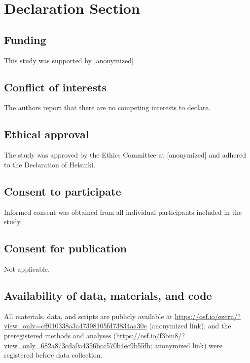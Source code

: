 \documentclass[
  man,
  floatsintext,
  longtable,
  nolmodern,
  notxfonts,
  notimes,
  mask,
  colorlinks=true,linkcolor=blue,citecolor=blue,urlcolor=blue]{apa7}
\begin{document}
\section{Declaration Section}\label{declaration-section}

\subsection{Funding}\label{funding}

This study was supported by {[}anonymized{]}

\subsection{Conflict of interests}\label{conflict-of-interests}

The authors report that there are no competing interests to declare.

\subsection{Ethical approval}\label{ethical-approval}

The study was approved by the Ethics Committee at {[}anonymized{]} and
adhered to the Declaration of Helsinki.

\subsection{Consent to participate}\label{consent-to-participate}

Informed consent was obtained from all individual participants included
in the study.

\subsection{Consent for publication}\label{consent-for-publication}

Not applicable.

\subsection{Availability of data, materials, and
code}\label{availability-of-data-materials-and-code}

All materials, data, and scripts are publicly available at
\url{https://osf.io/ezcrn/?view_only=cff010338a3a47398105fd73834aa30e}
(anonymized link), and the preregistered methods and analyses
(\url{https://osf.io/f3bm8/?view_only=682a873cda0a4356bcc570b4ec9b55fb};
anonymized link) were registered before data collection.
\end{document}
